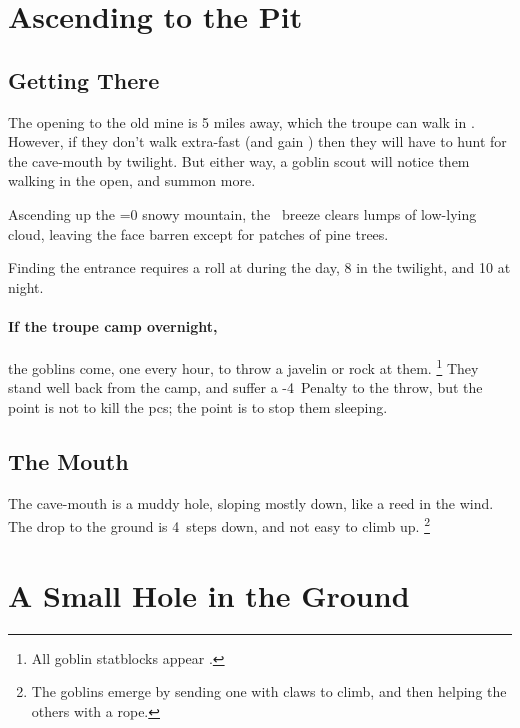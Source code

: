 \section{Ascending to the Pit}

\begin{multicols}{2}

\subsection{Getting There}

The opening to the old mine is 5 miles away, which the troupe can walk in .
However, if they don't walk extra-fast (and gain ) then they will have to hunt for the cave-mouth by twilight.
But either way, a goblin scout will notice them walking in the open, and summon more.

\begin{boxtext}
  Ascending up the \ifnum\value{temperature}=0 snowy \fi mountain, the \showTemperature\ breeze clears lumps of low-lying cloud, leaving the face barren except for patches of pine trees.
\end{boxtext}


Finding the entrance requires a  roll at \tn[6] during the day, 8 in the twilight, and 10 at night.

\paragraph{If the troupe camp overnight,}
the goblins come, one every hour, to throw a javelin or rock at them.%
\footnote{All goblin statblocks appear .}
They stand well back from the camp, and suffer a -4~Penalty to the throw, but the point is not to kill the \glspl{pc}; the point is to stop them sleeping.

\subsection{The Mouth}

The cave-mouth is a muddy hole, sloping mostly down, like a reed in the wind.
The drop to the ground is 4~\glspl{step} down, and not easy to climb up.%
\footnote{The goblins emerge by sending one with claws to climb, and then helping the others with a rope.}

\end{multicols}

\needspace{15em}
\section{A Small Hole in the Ground}
\label{goblinCaveEntrance}

